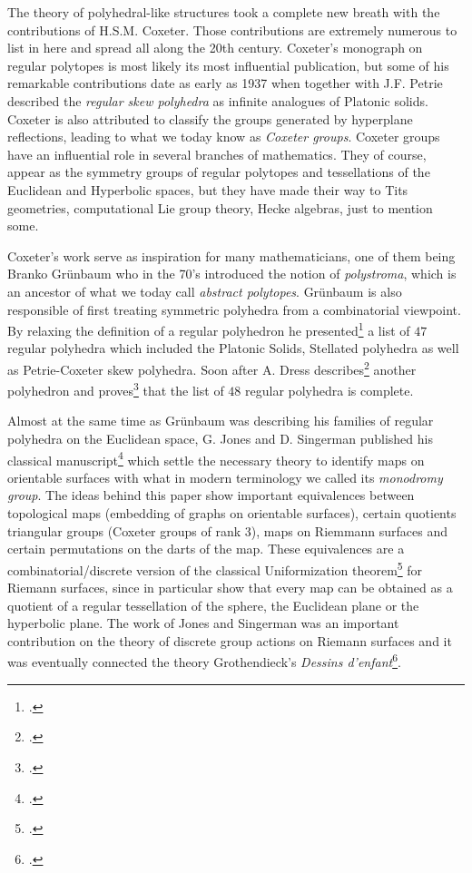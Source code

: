 The theory of polyhedral-like structures took a complete new breath with the contributions of H.S.M. Coxeter.
Those contributions are extremely numerous to list in here and spread all along the 20th century.
Coxeter's monograph on regular polytopes is most likely its most influential publication, but some of his remarkable contributions date as early as 1937 when together with J.F. Petrie described the \emph{regular skew polyhedra} as infinite analogues of Platonic solids.
Coxeter is also attributed to classify the groups generated by hyperplane reflections, leading to what we today know as \emph{Coxeter groups}.
Coxeter groups have an influential role in several branches of mathematics. They of course, appear as the symmetry groups of regular polytopes and tessellations of the Euclidean and Hyperbolic spaces, but they have made their way to Tits geometries, computational Lie group theory, Hecke algebras, just to mention some.


Coxeter's work serve as inspiration for many mathematicians, one of them being Branko Grünbaum who in the 70's introduced the notion of \emph{polystroma}, which is an ancestor of what we today call \emph{abstract polytopes}.
Grünbaum is also responsible of first treating symmetric polyhedra from a combinatorial viewpoint.
By relaxing the definition of a regular polyhedron he presented\footcite{Gruenbaum_1977_RegularPolyhedraOld} a list of $47$ regular polyhedra which included the Platonic Solids, Stellated polyhedra as well as Petrie-Coxeter skew polyhedra. Soon after A. Dress describes\footcite{Dress_1981_CombinatorialTheoryGrunbaums} another polyhedron and proves\footcite{Dress_1985_CombinatorialTheoryGrunbaums} that the list of $48$ regular polyhedra is complete.

Almost at the same time as Grünbaum was describing his families of regular polyhedra on the Euclidean space, G. Jones and D. Singerman published his classical manuscript\footcite{JonesSingerman_1978_TheoryMapsOrientable} which settle the necessary theory to identify maps on orientable surfaces with what in modern terminology we called its \emph{monodromy group}.
The ideas behind this paper show important equivalences between topological maps (embedding of graphs on orientable surfaces), certain quotients triangular groups (Coxeter groups of rank $3$), maps on Riemmann surfaces and certain permutations on the darts of the map.
These equivalences are a combinatorial/discrete version of the classical Uniformization theorem\footcite{Abikoff_1981_UniformizationTheorem} for Riemann surfaces, since in particular show that every map can be obtained as a quotient of a regular tessellation of the sphere, the Euclidean plane or the hyperbolic plane.
The work of Jones and Singerman was an important contribution on the theory of discrete group actions on Riemann surfaces and it was eventually connected the theory Grothendieck's \emph{Dessins d'enfant}\footcite{JonesWolfart_2016_DessinsDenfantsRiemann}.

